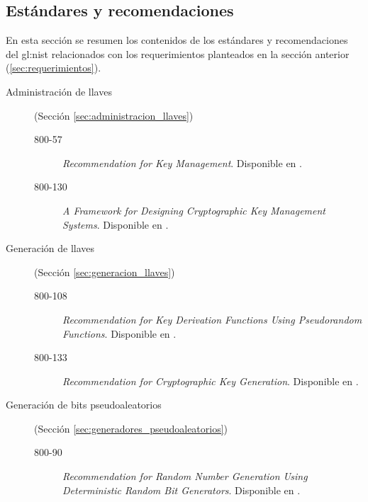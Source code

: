 %
%

\subsection{Estándares y recomendaciones}

En esta sección se resumen los contenidos de los estándares y recomendaciones
del \gls{gl:nist} relacionados con los requerimientos planteados en la
sección anterior (\ref{sec:requerimientos}).

\begin{description}

  \item[Administración de llaves] (Sección \ref{sec:administracion_llaves})
    \begin{description}
      \item[800-57] \textit{Recommendation for Key Management}. Disponible en
        \cite{nist_llaves}.
      \item[800-130] \textit{A Framework for Designing Cryptographic Key
        Management Systems}. Disponible en \cite{nist_disenio_llaves}.
    \end{description}

  \item[Generación de llaves] (Sección \ref{sec:generacion_llaves})
    \begin{description}
      \item[800-108] \textit{Recommendation for Key Derivation Functions Using
        Pseudorandom Functions}. Disponible en \cite{nist_derivacion_llaves}.
      \item[800-133] \textit{Recommendation for Cryptographic Key Generation}.
        Disponible en \cite{nist_creacion_llaves}.
    \end{description}

  \item[Generación de bits pseudoaleatorios] (Sección
    \ref{sec:generadores_pseudoaleatorios})
    \begin{description}
      \item[800-90] \textit{Recommendation for Random Number Generation Using
        Deterministic Random Bit Generators}. Disponible en
        \cite{nist_aleatorios}.
    \end{description}
\end{description}




